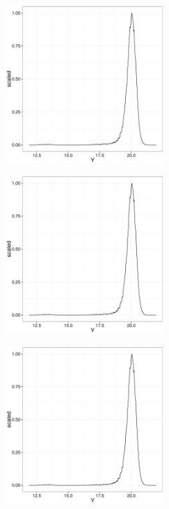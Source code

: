 \begin{figure}[ht!]
    \centering
    \begin{subfigure}[t]{0.45\textwidth}
        \includegraphics[page=1,height=6cm]{background/Figures/MissingDistribution.pdf}
        \caption{}
        
    \end{subfigure}
    \begin{subfigure}[t]{0.45\textwidth}
      \includegraphics[page=2,height=6cm]{background/Figures/MissingDistribution.pdf}
        \caption{}
         
    \end{subfigure}
     \begin{subfigure}[t]{0.45\textwidth}
      \includegraphics[page=3,height=6cm]{background/Figures/MissingDistribution.pdf}
        \caption{}
         

\end{subfigure}
\end{figure}
